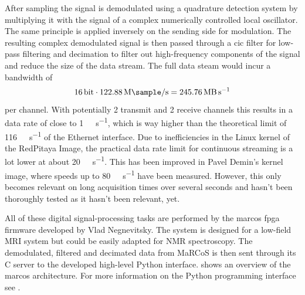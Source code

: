 After sampling the signal is demodulated using a quadrature detection system by multiplying it with the signal of a complex numerically controlled local oscillator. The same principle is applied inversely on the sending side for modulation. The resulting complex demodulated signal is then passed through a \acrfull{cic} filter for low-pass filtering and decimation to filter out high-frequency components of the signal and reduce the size of the data stream. The full data steam would incur a bandwidth of
\[
    \qty{16}{\bit} \cdot \qty{122.88}{\mega\sample\per\second} = \qty{245.76}{\mega\byte\per\second}
\]
per channel. With potentially 2 transmit and 2 receive channels this results in a data rate of close to \qty{1}{\giga\byte\per\second}, which is way higher than the theoretical limit of \qty{116}{\mega\byte\per\second} of the Ethernet interface. Due to inefficiencies in the Linux kernel of the RedPitaya Image, the practical data rate limit for continuous streaming is a lot lower at about \qty{20}{\mega\sample\per\second}. This has been improved in Pavel Demin's kernel image, where speeds up to \qty{80}{\mega\byte\per\second} have been measured. However, this only becomes relevant on long acquisition times over several seconds and hasn't been thoroughly tested as it hasn't been relevant, yet.

All of these digital signal-processing tasks are performed by the \acrshort{marcos} \acrshort{fpga} firmware developed by Vlad Negnevitsky. The system is designed for a low-field MRI system but could be easily adapted for NMR spectroscopy. The demodulated, filtered and decimated data from MaRCoS is then sent through its C server to the developed high-level Python interface.  shows an overview of the \acrshort{marcos} architecture. For more information on the Python programming interface see .

